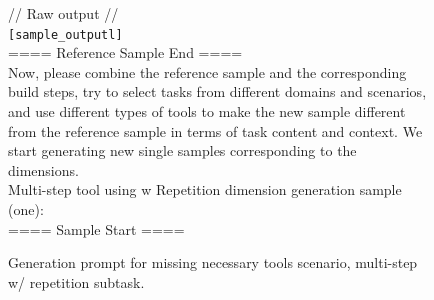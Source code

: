 \begin{figure}[!htb]
\begin{tcolorbox}[
    colback=white, 
    colframe=blue1, 
    boxrule=0.5mm,
    arc=0mm,
    outer arc=0mm,
    title=Missing Necessary Tools: Multi-step w/ Repetition - Generation Prompt
]
// Raw output //\\
\colorbox{blue1!50}{\texttt{[sample\_outputl]}}\\
==== Reference Sample End ====\\

Now, please combine the reference sample and the corresponding build steps, try to select tasks from different domains and scenarios, and use different types of tools to make the new sample different from the reference sample in terms of task content and context. We start generating new single samples corresponding to the dimensions.\\
Multi-step tool using w Repetition dimension generation sample (one):\\
==== Sample Start ====
\end{tcolorbox}
\caption{Generation prompt for missing necessary tools scenario, multi-step w/ repetition subtask.}
\label{fig:multi-step-wrep-prompt}
\end{figure}